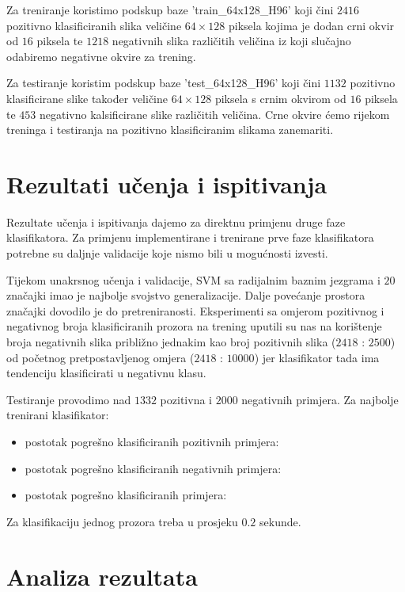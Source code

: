 \documentclass[seminar]{fer}
\begin{document}
Za treniranje koristimo podskup baze 'train\_64x128\_H96' koji čini $2416$ pozitivno klasificiranih slika veličine $64 \times 128$ piksela kojima je dodan crni okvir od $16$ piksela te $1218$ negativnih slika različitih veličina iz koji slučajno odabiremo negativne okvire za trening. 

Za testiranje koristim podskup baze 'test\_64x128\_H96' koji čini $1132$ pozitivno klasificirane slike također veličine $64 \times 128$ piksela s crnim okvirom od $16$ piksela te $453$ negativno kalsificirane slike različitih veličina. Crne okvire ćemo rijekom treninga i testiranja na pozitivno klasificiranim slikama zanemariti.


\section{Rezultati učenja i ispitivanja}

Rezultate učenja i ispitivanja dajemo za direktnu primjenu druge faze klasifikatora. Za primjenu implementirane i trenirane prve faze klasifikatora potrebne su daljnje validacije koje nismo bili u mogućnosti izvesti. 

Tijekom unakrsnog učenja i validacije, SVM sa radijalnim baznim jezgrama i $20$ značajki imao je najbolje svojstvo generalizacije. Dalje povećanje prostora značajki dovodilo je do pretreniranosti. Eksperimenti sa omjerom pozitivnog i negativnog broja klasificiranih prozora na trening uputili su nas na korištenje broja negativnih slika približno jednakim kao broj pozitivnih slika ($2418$ : $2500$) od početnog pretpostavljenog omjera ($2418$ : $10000$) jer klasifikator tada ima tendenciju klasificirati u negativnu klasu. 

Testiranje provodimo nad $1332$ pozitivna i $2000$ negativnih primjera. Za najbolje trenirani klasifikator:
\begin{itemize}
\item{postotak pogrešno klasificiranih pozitivnih primjera:}
\item{postotak pogrešno klasificiranih negativnih primjera:}
\item{postotak pogrešno klasificiranih primjera:}
\end{itemize}

Za klasifikaciju jednog prozora treba u prosjeku $0.2$ sekunde. 

\section{Analiza rezultata}
\end{document}
